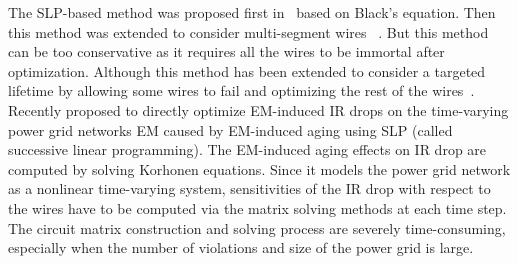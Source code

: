  The SLP-based method was proposed first in~\cite{Tan:DAC'99} based on Black's equation. Then this method was extended to consider multi-segment wires ~\cite{ZhouSun:ASPDAC'18}. But this method can be too conservative as it requires all the wires to be immortal after optimization. Although this method has been extended to consider a targeted lifetime by allowing some wires to fail and optimizing the rest of the wires~\cite{ZhouSun:TVLSI'19}.  Recently \cite{Sukharev:2019pg} proposed to directly optimize EM-induced IR drops on the time-varying power grid networks EM caused by EM-induced aging using SLP (called successive linear programming).  The EM-induced aging effects on IR drop are computed by solving Korhonen equations.  Since it models the power grid network as a nonlinear time-varying system, sensitivities of the IR drop with respect to the wires have to be computed via the matrix solving methods at each time step. The circuit matrix construction and solving process are severely time-consuming, especially when the number of violations and size of the power grid is large.






